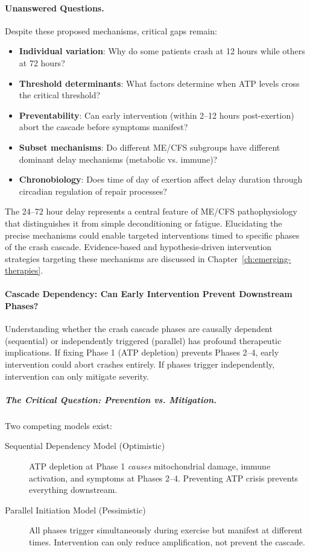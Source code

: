 \paragraph{Unanswered Questions.}

Despite these proposed mechanisms, critical gaps remain:

\begin{itemize}
    \item \textbf{Individual variation}: Why do some patients crash at 12 hours while others at 72 hours?
    \item \textbf{Threshold determinants}: What factors determine when ATP levels cross the critical threshold?
    \item \textbf{Preventability}: Can early intervention (within 2--12 hours post-exertion) abort the cascade before symptoms manifest?
    \item \textbf{Subset mechanisms}: Do different ME/CFS subgroups have different dominant delay mechanisms (metabolic vs. immune)?
    \item \textbf{Chronobiology}: Does time of day of exertion affect delay duration through circadian regulation of repair processes?
\end{itemize}

The 24--72 hour delay represents a central feature of ME/CFS pathophysiology that distinguishes it from simple deconditioning or fatigue. Elucidating the precise mechanisms could enable targeted interventions timed to specific phases of the crash cascade. Evidence-based and hypothesis-driven intervention strategies targeting these mechanisms are discussed in Chapter~\ref{ch:emerging-therapies}.

\paragraph{Cascade Dependency: Can Early Intervention Prevent Downstream Phases?}

Understanding whether the crash cascade phases are causally dependent (sequential) or independently triggered (parallel) has profound therapeutic implications. If fixing Phase 1 (ATP depletion) prevents Phases 2--4, early intervention could abort crashes entirely. If phases trigger independently, intervention can only mitigate severity.

\subparagraph{The Critical Question: Prevention vs. Mitigation.}

Two competing models exist:

\begin{description}
    \item[Sequential Dependency Model (Optimistic)] ATP depletion at Phase 1 \emph{causes} mitochondrial damage, immune activation, and symptoms at Phases 2--4. Preventing ATP crisis prevents everything downstream.

    \item[Parallel Initiation Model (Pessimistic)] All phases trigger simultaneously during exercise but manifest at different times. Intervention can only reduce amplification, not prevent the cascade.
\end{description}

